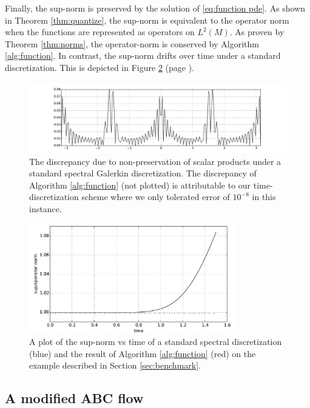 \documentclass[final,leqno]{siamart}
\begin{document}
Finally, the sup-norm is preserved by the solution of \eqref{eq:function pde}.
As shown in Theorem \ref{thm:quantize}, the sup-norm is equivalent to the operator norm when the functions are represented as operators on $L^{2}(M)$.
As proven by Theorem \ref{thm:norms}, the operator-norm is conserved by Algorithm \ref{alg:function}.
In contrast, the sup-norm drifts over time under a standard discretization.  
This is depicted in Figure \ref{fig:norms} (page \pageref{fig:norms}).

\begin{figure}[p]
	\hspace*{-1.2cm}
	\includegraphics[width=1.15\textwidth]{./images/function_plots/discrepancy}
	\caption{The discrepancy due to non-preservation of scalar products under a standard spectral Galerkin discretization. 
	The discrepancy of Algorithm \ref{alg:function} (not plotted) is attributable to our time-discretization scheme where we only tolerated error of $10^{-8}$ in this instance.}
	\label{fig:discrepancy}
\end{figure}  

\begin{figure}[p]
	\hspace*{-1.2cm}
	\centering
	\includegraphics[width=0.8\textwidth]{./images/L_inf_plot.pdf}
	\caption{A plot of the sup-norm vs time of a standard spectral discretization (blue) and the result of Algorithm \ref{alg:function} (red) on the example described in Section \ref{sec:benchmark}.}
	\label{fig:norms}
\end{figure}

\subsection{A modified ABC flow}
\label{sec:ABC_flow}
\end{document}
